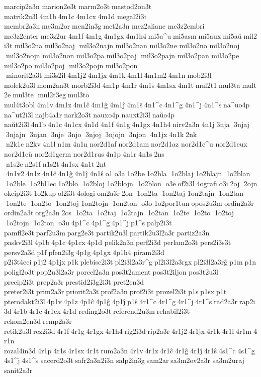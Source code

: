 marcip2a3n 
marion2e3t marm2o3t mastod2on3t 
matrik2u3l 4m1b 4m1c 4m1cx 4m1d 	megal2i3t 	membr2a3n me3m2or men2in3g met2a3n 
mez2alianc 
me3z2embri 
me3z2enter me3z2ur 4m1f 4m1g 4m1gx 4m1h4 mi5a^u mi5asm mi5aux mi5aŭ mil2i3t 	mil3o2na  
mil3o2naj  mil3o2najn  
mil3o2nan  	mil3o2ne  	mil3o2no  
mil3o2noj  mil3o2nojn  
mil3o2non  	mil3o2pa  
mil3o2paj  mil3o2pajn  
mil3o2pan  	mil3o2pe  	mil3o2po  
mil3o2poj  mil3o2pojn  
mil3o2pon  minorit2a3t mi3s2il 4m1j2 4m1jx 4m1k 4m1l 4m1m2 4m1n mob2i3l 	molek2u3l mom2an3t morb2i3d 4m1p 4m1r 4m1s 4m1sx 4m1t mul2t1 mul3ta mult2e mul3te  mul2t3eg mul3to 	mul4t3obl 4m1v 4m1z 4m1ĉ 4m1ĝ 4m1ĵ 4m1ŝ 4n1^c 4n1^g 4n1^j 4n1^s na^uo4p 	na^ut2i3l najb4a1r nark2o3t nauxo4p 	nauxt2i3l naŭo4p 	naŭt2i3l 4n1b 4n1c 4n1cx 4n1d 4n1f 4n1g 4n1gx 4n1h4 nirv2a3n 4n1j 3nja  3njaj  3njajn  3njan  3nje  3njo  3njoj  3njojn  3njon  4n1jx 4n1k 2nk  n2k1c n2kv 4n1l n1m 4n1n nor2d1af nor2d1am nor2d1az 	nor2d1e^u 	nor2d1eux 	nor2d1eŭ 
nor2d1germ 	nor2d1rus 4n1p 4n1r 4n1s 2ns  n1s2c n2s1f n1s2t 4n1sx 4n1t 2nt  4n1v2 4n1z 4n1ĉ 4n1ĝ 4n1ĵ 4n1ŝ o1 o3a 1o2be 1o2bla  1o2blaj  	1o2blajn  1o2blan  1o2ble  1o2bl1ec 1o2blo  1o2bloj  	1o2blojn  1o2blon  o3e of2i3l 4ografi o3i 2oj  2ojn  	okcip2i3t 1o2kup ol2i3t 4ologi om2a3r 2on  1on2ta  1on2taj  	1on2tajn  1on2tan  1on2te  1on2to  1on2toj  	1on2tojn  1on2ton  o3o 
1o2por1tun opos2u3m 	ordin2a3r 	ordin2a3t org2a3n 2os  1o2ta  1o2taj  1o2tajn  1o2tan  1o2te  1o2to  1o2toj  1o2tojn  1o2ton  o3u 4p1^c 4p1^g 4p1^j p1^s palp2i3t 	pamfl2e3t parf2u3m parg2e3t 
partik2u3l partik2u3l2a3r 
partiz2a3n 	paskv2i3l 4p1b 4p1c 4p1cx 4p1d 	pelik2a3n perf2i3d 
perlam2o3t 
pers2i3s3t 	persv2a3d p1f pfen2i3g 4p1g 4p1gx 4p1h4 	piram2i3d 	p2i3t4eci p1j2 4p1jx p1k plebisc2i3t pl2i3l2a3r^g pl2i3l2a3rgx pl2i3l2a3rĝ p1m p1n 
poligl2o3t pop2u3l2a3r 
porcel2a3n pos3t2ament pos3t2iljon 	pos3t2u3l 
precip2i3t prep2a3r prestid2i3g2i3t 	pret2en3d 
preter2i3t prim2a3r priorit2a3t prof2a3n prof2i3t 
prozel2i3t p1s p1sx p1t 
pterodakt2i3l 4p1v 4p1z 4p1ĉ 4p1ĝ 4p1ĵ p1ŝ 4r1^c 4r1^g 4r1^j 4r1^s rad2a3r rap2i3d 4r1b 4r1c 4r1cx 4r1d 
reding2o3t referend2u3m rehabil2i3t 
rekom2en3d remp2a3r 	retik2u3l rez2i3d 4r1f 4r1g 4r1gx 4r1h4 rig2i3d rip2a3r 4r1j2 4r1jx 4r1k 4r1l 4r1m 4r1n 
rozal4in3d 4r1p 4r1s 4r1sx 4r1t rum2a3n 4r1v 4r1z 4r1ĉ 4r1ĝ 4r1ĵ 4r1ŝ 4s1^c 4s1^g 4s1^j 4s1^s 
sacerd2o3t safr2a3n2i3n 	salp2in3g sam2ar sa3m2ov2a3r 	sa3m2uraj 	sanit2a3r 
